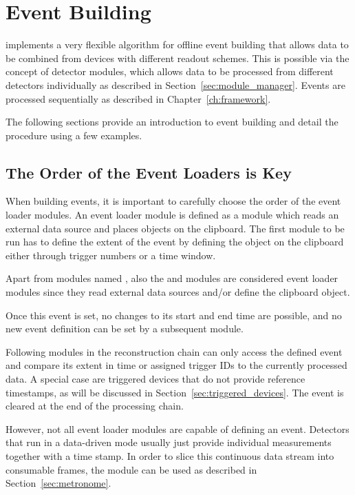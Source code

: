\chapter{Event Building}
\label{ch:events}

\corry implements a very flexible algorithm for offline event building that allows data to be combined from devices with different readout schemes.
This is possible via the concept of detector modules, which allows data to be processed from different detectors individually as described in Section~\ref{sec:module_manager}.
Events are processed sequentially as described in Chapter~\ref{ch:framework}.

The following sections provide an introduction to event building and detail the procedure using a few examples.

\section{The Order of the Event Loaders is Key}

When building events, it is important to carefully choose the order of the event loader modules.
An event loader module is defined as a module which reads an external data source and places \corry objects on the clipboard.
The first module to be run has to define the extent of the event by defining the  object on the clipboard either through trigger numbers or a time window.

Apart from modules named , also the  and  modules are considered event loader modules since they read external data sources and/or define the clipboard  object.

\begin{warning}
Once this event is set, no changes to its start and end time are possible, and no new event definition can be set by a subsequent module.
\end{warning}

Following modules in the reconstruction chain can only access the defined event and compare its extent in time or assigned trigger IDs to the currently processed data.
A special case are triggered devices that do not provide reference timestamps, as will be discussed in Section~\ref{sec:triggered_devices}.
The event is cleared at the end of the processing chain.

However, not all event loader modules are capable of defining an event.
Detectors that run in a data-driven mode usually just provide individual measurements together with a time stamp.
In order to slice this continuous data stream into consumable frames, the  module can be used as described in Section~\ref{sec:metronome}.

